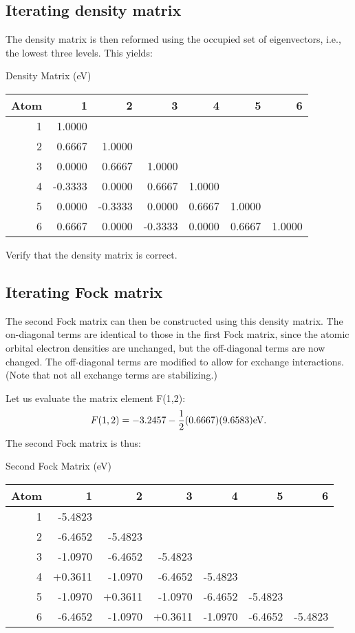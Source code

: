 \subsection{Iterating density matrix}
The density matrix is then reformed using the occupied set of eigenvectors,
i.e., the lowest three levels. This yields:
\begin{center}
Density Matrix (eV) \nopagebreak \\
\begin{tabular}{rrrrrrr} \hline
 Atom &   1    &  2   &   3    &  4    &  5  &    6 \\ \hline
 1& 1.0000  \\
 2& 0.6667& 1.0000  \\
 3& 0.0000& 0.6667& 1.0000  \\
 4& -0.3333& 0.0000& 0.6667& 1.0000  \\
 5& 0.0000& -0.3333& 0.0000& 0.6667& 1.0000  \\
 6& 0.6667& 0.0000 &-0.3333& 0.0000& 0.6667& 1.0000  \\ \hline
\end{tabular}
\end{center}
 Verify that the density matrix is correct.

\subsection{Iterating Fock matrix}
The second Fock matrix can then be constructed using this density matrix. The
on-diagonal terms are identical to those in the first Fock matrix, since the
atomic orbital electron densities are unchanged, but the off-diagonal terms are
now changed. The off-diagonal terms are modified to allow for exchange
interactions. (Note that not all exchange terms are stabilizing.)

Let us evaluate the matrix element F(1,2):
$$
  F(1,2) = -3.2457 - \frac{1}{2}(0.6667)(9.6583){\rm eV}.
$$
The second Fock matrix is thus:
\begin{center}
Second Fock Matrix (eV) \nopagebreak \\
\begin{tabular}{rrrrrrr} \hline
 Atom &   1    &  2   &   3    &  4    &  5  &    6 \\ \hline
 1& -5.4823  \\
 2& -6.4652& -5.4823  \\
 3& -1.0970& -6.4652& -5.4823  \\
 4& +0.3611& -1.0970& -6.4652 &-5.4823  \\
 5& -1.0970& +0.3611& -1.0970& -6.4652& -5.4823  \\
 6& -6.4652& -1.0970 &+0.3611& -1.0970 &-6.4652& -5.4823  \\ \hline
\end{tabular}
\end{center}

